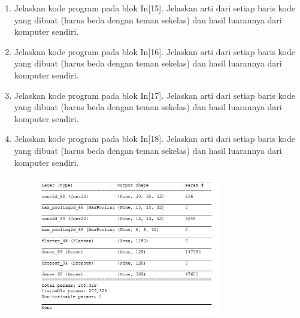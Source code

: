 \begin{enumerate}
	\item Jelaskan kode program pada blok  In[15]. Jelaskan arti dari setiap baris kode yang dibuat (harus beda dengan teman sekelas) dan hasil luarannya dari komputer sendiri.
	\hfill\break

	

	\item Jelaskan kode program pada blok  In[16]. Jelaskan arti dari setiap baris kode yang dibuat (harus beda dengan teman sekelas) dan hasil luarannya dari komputer sendiri.
	\hfill\break

	

	\item Jelaskan kode program pada blok  In[17]. Jelaskan arti dari setiap baris kode yang dibuat (harus beda dengan teman sekelas) dan hasil luarannya dari komputer sendiri.
	\hfill\break

	

	\item Jelaskan kode program pada blok  In[18]. Jelaskan arti dari setiap baris kode yang dibuat (harus beda dengan teman sekelas) dan hasil luarannya dari komputer sendiri.
	\hfill\break

	
	\begin{figure}[H]
		\includegraphics[width=8cm]{figures/1174006/chapter7/praktek/18.png}
		\centering
	\end{figure}


\end{enumerate}
